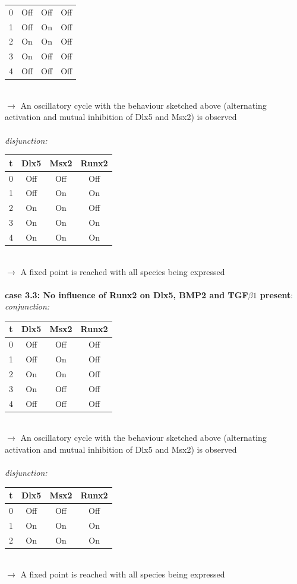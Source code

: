 \documentclass[11pt]{article}
\begin{document}
\begin{appendices}
\begin{tabular}{c c c c}
\hline
0 & Off & Off & Off \\
1 & Off & On & Off \\
2 & On & On & Off \\
3 & On & Off & Off \\
4 & Off & Off & Off
\end{tabular}
\\
$\rightarrow$ An oscillatory cycle with the behaviour sketched above (alternating activation and mutual inhibition of Dlx5 and Msx2) is observed    
\\ \\
\textit{disjunction:}
\\ 
\begin{tabular}{c c c c}
t & Dlx5 & Msx2 & Runx2 \\
\hline
0 & Off & Off & Off \\
1 & Off & On & On \\
2 & On & On & Off \\
3 & On & On & On \\
4 & On & On & On
\end{tabular}
\\
$\rightarrow$ A fixed point is reached with all species being expressed
\\ \\
\textbf{case 3.3: No influence of Runx2 on Dlx5, BMP2 and TGF$\beta1$ present}: \\
\textit{conjunction:}
\\ 
\begin{tabular}{c c c c}
t & Dlx5 & Msx2 & Runx2 \\
\hline
0 & Off & Off & Off \\
1 & Off & On & Off \\
2 & On & On & Off \\
3 & On & Off & Off \\
4 & Off & Off & Off
\end{tabular}
\\
$\rightarrow$ An oscillatory cycle with the behaviour sketched above (alternating activation and mutual inhibition of Dlx5 and Msx2) is observed  
\\ \\
\textit{disjunction:}
\\ 
\begin{tabular}{c c c c}
t & Dlx5 & Msx2 & Runx2 \\
\hline
0 & Off & Off & Off \\
1 & On & On & On \\
2 & On & On & On
\end{tabular}
\\
$\rightarrow$ A fixed point is reached with all species being expressed


\end{appendices}
\end{document}
